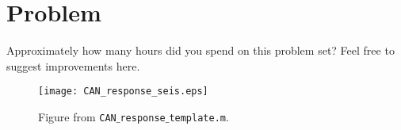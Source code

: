 \documentclass[11pt,titlepage,fleqn]{article}
\newcommand{\tfile}{{\tt lab$\_$response.m}}
\begin{document}

\section*{Problem}

Approximately how many hours did you spend on this problem set? Feel free to suggest improvements here.





%

\begin{figure}
\hspace{-1cm}
\texttt{[image: CAN\_response\_seis.eps]}
\caption[]
{{
Figure from {\tt CAN$\_$response$\_$template.m}.
}}
\label{fig:seis}
\end{figure}

\end{document}
